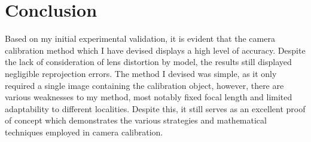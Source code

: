 \section{Conclusion}
Based on my initial experimental validation, it is evident that the camera calibration method which I have devised displays a high level of accuracy. Despite the lack of consideration of lens distortion by model, the results still displayed negligible reprojection errors. The method I devised was simple, as it only required a single image containing the calibration object, however, there are various weaknesses to my method, most notably fixed focal length and limited adaptability to different localities. Despite this, it still serves as an excellent proof of concept which demonstrates the various strategies and mathematical techniques employed in camera calibration.
